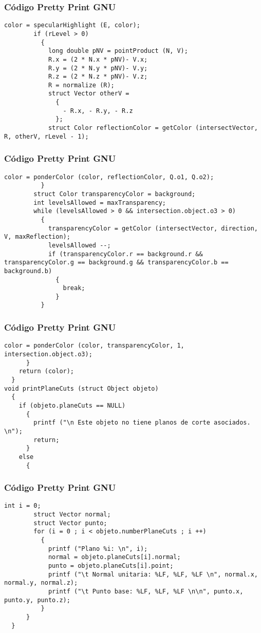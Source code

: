 \documentclass{beamer}
\begin{document}
\begin{frame}[fragile]
\frametitle{C\'odigo Pretty Print GNU}
\begin{lstlisting}[style=CStyle]
        color = specularHighlight (E, color);
        if (rLevel > 0)
          {
            long double pNV = pointProduct (N, V);
            R.x = (2 * N.x * pNV)- V.x;
            R.y = (2 * N.y * pNV)- V.y;
            R.z = (2 * N.z * pNV)- V.z;
            R = normalize (R);
            struct Vector otherV =
              {
                - R.x, - R.y, - R.z
              };
            struct Color reflectionColor = getColor (intersectVector, R, otherV, rLevel - 1);
\end{lstlisting}
\end{frame}
\begin{frame}[fragile]
\frametitle{C\'odigo Pretty Print GNU}
\begin{lstlisting}[style=CStyle]
            color = ponderColor (color, reflectionColor, Q.o1, Q.o2);
          }
        struct Color transparencyColor = background;
        int levelsAllowed = maxTransparency;
        while (levelsAllowed > 0 && intersection.object.o3 > 0)
          {
            transparencyColor = getColor (intersectVector, direction, V, maxReflection);
            levelsAllowed --;
            if (transparencyColor.r == background.r && transparencyColor.g == background.g && transparencyColor.b == background.b)
              {
                break;
              }
          }
\end{lstlisting}
\end{frame}
\begin{frame}[fragile]
\frametitle{C\'odigo Pretty Print GNU}
\begin{lstlisting}[style=CStyle]
        color = ponderColor (color, transparencyColor, 1, intersection.object.o3);
      }
    return (color);
  }
void printPlaneCuts (struct Object objeto)
  {
    if (objeto.planeCuts == NULL)
      {
        printf ("\n Este objeto no tiene planos de corte asociados. \n");
        return;
      }
    else
      {
        \end{lstlisting}
\end{frame}
\begin{frame}[fragile]
\frametitle{C\'odigo Pretty Print GNU}
\begin{lstlisting}[style=CStyle]
        int i = 0;
        struct Vector normal;
        struct Vector punto;
        for (i = 0 ; i < objeto.numberPlaneCuts ; i ++)
          {
            printf ("Plano %i: \n", i);
            normal = objeto.planeCuts[i].normal;
            punto = objeto.planeCuts[i].point;
            printf ("\t Normal unitaria: %LF, %LF, %LF \n", normal.x, normal.y, normal.z);
            printf ("\t Punto base: %LF, %LF, %LF \n\n", punto.x, punto.y, punto.z);
          }
      }
  }
\end{lstlisting}
\end{frame}
\end{document}
